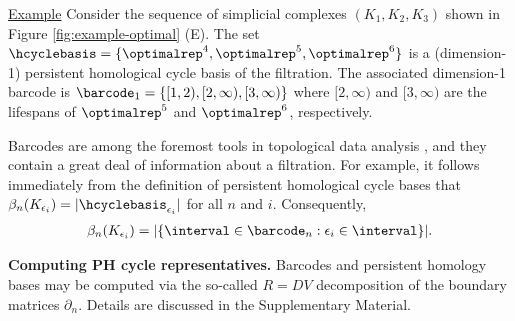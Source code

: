 \noindent \underline{Example}  Consider the sequence of simplicial complexes $(K_1, K_2, K_3)$ shown in Figure \ref{fig:example-optimal} (E).  The set
    $
        \hcyclebasis = \{\optimalrep^4, \optimalrep^5, \optimalrep^6 \}
    $
is a (dimension-1) persistent homological cycle basis of the filtration.  The associated dimension-1 barcode is     
    $
    \barcode_1 = \{[1,2), [2,\infty), [3, \infty) \} 
    $ 
where $[2,\infty)$ and $[3,\infty)$ are the lifespans of  $\optimalrep^5$ and $\optimalrep^6$, respectively.

Barcodes are among the foremost tools in topological data analysis \cite{barcodeGhrist,  persistenthomologyasurvey}, and they contain a great deal of information about a filtration.  For example, it follows  immediately from the definition of persistent homological cycle bases  that
    $
        \beta_n(K_{\epsilon_i})
        =
        |\hcyclebasis_{\epsilon_i}|
    $
for all $n$ and $i$.  Consequently,
    \begin{align*}
        \beta_n(K_{\epsilon_i})
        =
        |\{\interval \in \barcode_n : \epsilon_i \in \interval \}|.
    \end{align*}

\noindent \textbf{Computing PH cycle representatives.} Barcodes and persistent homology bases may be computed via the so-called $R = DV$ decomposition \cite{cohen2006vines} of the boundary matrices $\partial_n$. Details are discussed in the Supplementary Material.





